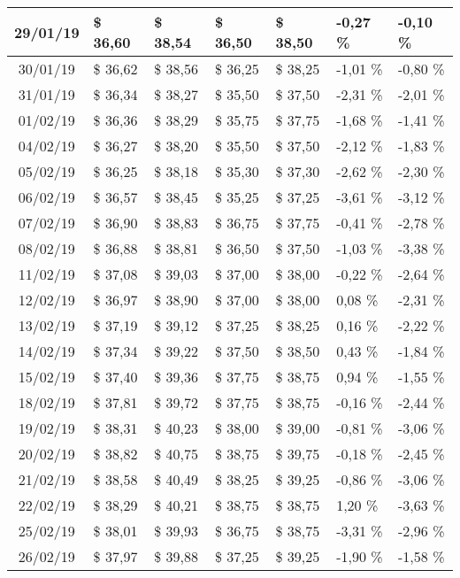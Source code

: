 \begin{center}
\begin{longtable}{|c|p{1.5cm}|p{1.5cm}|p{1.5cm}|p{1.5cm}|p{1.5cm}|p{1.5cm}|}
29/01/19 & \$ 36,60 & \$ 38,54 & \$ 36,50 & \$ 38,50 & -0,27 \% & -0,10 \% \\ \hline
30/01/19 & \$ 36,62 & \$ 38,56 & \$ 36,25 & \$ 38,25 & -1,01 \% & -0,80 \% \\ \hline
31/01/19 & \$ 36,34 & \$ 38,27 & \$ 35,50 & \$ 37,50 & -2,31 \% & -2,01 \% \\ \hline
01/02/19 & \$ 36,36 & \$ 38,29 & \$ 35,75 & \$ 37,75 & -1,68 \% & -1,41 \% \\ \hline
04/02/19 & \$ 36,27 & \$ 38,20 & \$ 35,50 & \$ 37,50 & -2,12 \% & -1,83 \% \\ \hline
05/02/19 & \$ 36,25 & \$ 38,18 & \$ 35,30 & \$ 37,30 & -2,62 \% & -2,30 \% \\ \hline
06/02/19 & \$ 36,57 & \$ 38,45 & \$ 35,25 & \$ 37,25 & -3,61 \% & -3,12 \% \\ \hline
07/02/19 & \$ 36,90 & \$ 38,83 & \$ 36,75 & \$ 37,75 & -0,41 \% & -2,78 \% \\ \hline
08/02/19 & \$ 36,88 & \$ 38,81 & \$ 36,50 & \$ 37,50 & -1,03 \% & -3,38 \% \\ \hline
11/02/19 & \$ 37,08 & \$ 39,03 & \$ 37,00 & \$ 38,00 & -0,22 \% & -2,64 \% \\ \hline
12/02/19 & \$ 36,97 & \$ 38,90 & \$ 37,00 & \$ 38,00 & 0,08 \% & -2,31 \% \\ \hline
13/02/19 & \$ 37,19 & \$ 39,12 & \$ 37,25 & \$ 38,25 & 0,16 \% & -2,22 \% \\ \hline
14/02/19 & \$ 37,34 & \$ 39,22 & \$ 37,50 & \$ 38,50 & 0,43 \% & -1,84 \% \\ \hline
15/02/19 & \$ 37,40 & \$ 39,36 & \$ 37,75 & \$ 38,75 & 0,94 \% & -1,55 \% \\ \hline
18/02/19 & \$ 37,81 & \$ 39,72 & \$ 37,75 & \$ 38,75 & -0,16 \% & -2,44 \% \\ \hline
19/02/19 & \$ 38,31 & \$ 40,23 & \$ 38,00 & \$ 39,00 & -0,81 \% & -3,06 \% \\ \hline
20/02/19 & \$ 38,82 & \$ 40,75 & \$ 38,75 & \$ 39,75 & -0,18 \% & -2,45 \% \\ \hline
21/02/19 & \$ 38,58 & \$ 40,49 & \$ 38,25 & \$ 39,25 & -0,86 \% & -3,06 \% \\ \hline
22/02/19 & \$ 38,29 & \$ 40,21 & \$ 38,75 & \$ 38,75 & 1,20 \% & -3,63 \% \\ \hline
25/02/19 & \$ 38,01 & \$ 39,93 & \$ 36,75 & \$ 38,75 & -3,31 \% & -2,96 \% \\ \hline
26/02/19 & \$ 37,97 & \$ 39,88 & \$ 37,25 & \$ 39,25 & -1,90 \% & -1,58 \% \\ \hline

\end{longtable}
\end{center}
